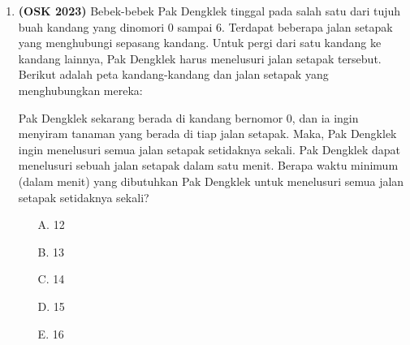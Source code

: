 \documentclass[a4paper]{article}
\begin{document}
\begin{enumerate}
  Misalnya, waktu tempuh dari kota 2 ke 7 adalah 3, karena kita dapat melalui jalur 2 → 3 (waktu tempuh = 2) dan jalur 3 → 7 (waktu tempuh = 1), sehingga total = 2 + 1 = 3. Kota manakah yang waktu tempuhnya dari kota 0 paling besar?
  \begin{multicols}{5}
    \begin{itemize}
      \item[A.] 3
      \item[B.] 4
      \item[C.] 5
      \item[D.] 6
      \item[E.] 7
  \end{itemize}
  \end{multicols}

  \item\textbf{(OSK 2023)} Bebek-bebek Pak Dengklek tinggal pada salah satu dari tujuh buah kandang yang dinomori 0 sampai 6. Terdapat beberapa jalan setapak yang menghubungi sepasang kandang. Untuk pergi dari satu kandang ke kandang lainnya, Pak Dengklek harus menelusuri jalan setapak tersebut. Berikut adalah peta kandang-kandang dan jalan setapak yang menghubungkan mereka:

  \begin{center}
  \end{center}
  
  Pak Dengklek sekarang berada di kandang bernomor 0, dan ia ingin menyiram tanaman yang berada di tiap jalan setapak. Maka, Pak Dengklek ingin menelusuri semua jalan setapak setidaknya sekali. Pak Dengklek dapat menelusuri sebuah jalan setapak dalam satu menit. Berapa waktu minimum (dalam menit) yang dibutuhkan Pak Dengklek untuk menelusuri semua jalan setapak setidaknya sekali?
  \begin{multicols}{5}
    \begin{itemize}
      \item[A.] 12
      \item[B.] 13
      \item[C.] 14
      \item[D.] 15
      \item[E.] 16
    \end{itemize}
  \end{multicols}


\end{enumerate}
\end{document}

